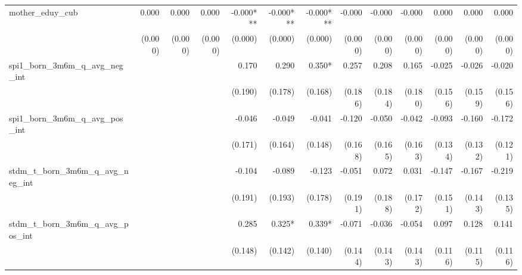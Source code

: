 \begin{tabular}{lrrrrrrrrrrrr}
mother\_eduy\_cub                           &        0.000 &        0.000 &        0.000 &    -0.000*** &    -0.000*** &    -0.000*** &       -0.000 &       -0.000 &       -0.000 &        0.000 &        0.000 &        0.000 \\ 
                                            &      (0.000) &      (0.000) &      (0.000) &      (0.000) &      (0.000) &      (0.000) &      (0.000) &      (0.000) &      (0.000) &      (0.000) &      (0.000) &      (0.000) \\ 
spi1\_born\_3m6m\_q\_avg\_neg\_int          &              &              &              &        0.170 &        0.290 &       0.350* &        0.257 &        0.208 &        0.165 &       -0.025 &       -0.026 &       -0.020 \\ 
                                            &              &              &              &      (0.190) &      (0.178) &      (0.168) &      (0.186) &      (0.184) &      (0.180) &      (0.156) &      (0.159) &      (0.156) \\ 
spi1\_born\_3m6m\_q\_avg\_pos\_int          &              &              &              &       -0.046 &       -0.049 &       -0.041 &       -0.120 &       -0.050 &       -0.042 &       -0.093 &       -0.160 &       -0.172 \\ 
                                            &              &              &              &      (0.171) &      (0.164) &      (0.148) &      (0.168) &      (0.165) &      (0.163) &      (0.134) &      (0.132) &      (0.121) \\ 
stdm\_t\_born\_3m6m\_q\_avg\_neg\_int       &              &              &              &       -0.104 &       -0.089 &       -0.123 &       -0.051 &        0.072 &        0.031 &       -0.147 &       -0.167 &       -0.219 \\ 
                                            &              &              &              &      (0.191) &      (0.193) &      (0.178) &      (0.191) &      (0.188) &      (0.172) &      (0.151) &      (0.143) &      (0.135) \\ 
stdm\_t\_born\_3m6m\_q\_avg\_pos\_int       &              &              &              &        0.285 &       0.325* &       0.339* &       -0.071 &       -0.036 &       -0.054 &        0.097 &        0.128 &        0.141 \\ 
                                            &              &              &              &      (0.148) &      (0.142) &      (0.140) &      (0.144) &      (0.143) &      (0.143) &      (0.116) &      (0.115) &      (0.116) \\ 

\end{tabular}
